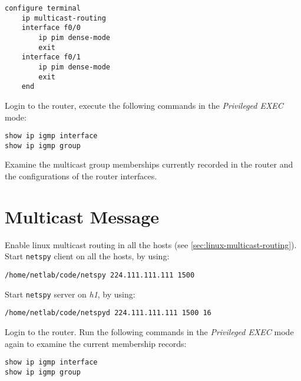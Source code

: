 \documentclass{../UTNetLab}
\begin{document}
    \begin{lstlisting}[language=cisco]
configure terminal
    ip multicast-routing
    interface f0/0
        ip pim dense-mode
        exit
    interface f0/1
        ip pim dense-mode
        exit
    end
    \end{lstlisting}

    Login to the router, execute the following commands in the \textit{Privileged EXEC} mode:

    \begin{lstlisting}[language=cisco]
show ip igmp interface
show ip igmp group
    \end{lstlisting}

    \begin{report}
    \item Examine the multicast group memberships currently recorded in the router and the configurations of the router interfaces.
    \end{report}

\section{Multicast Message}
    Enable linux multicast routing in all the hosts (see \autoref{sec:linux-multicast-routing}).\\
    Start \lstinline{netspy} client on all the hosts, by using:

    \begin{lstlisting}
/home/netlab/code/netspy 224.111.111.111 1500
    \end{lstlisting}
    Start \lstinline{netspy} server on \textit{h1}, by using:

    \begin{lstlisting}
/home/netlab/code/netspyd 224.111.111.111 1500 16
    \end{lstlisting}
    
    Login to the router.
    Run the following commands in the \textit{Privileged EXEC} mode again to examine the current membership records:

    \begin{lstlisting}[language=cisco]
show ip igmp interface
show ip igmp group
    \end{lstlisting}
\end{document}
